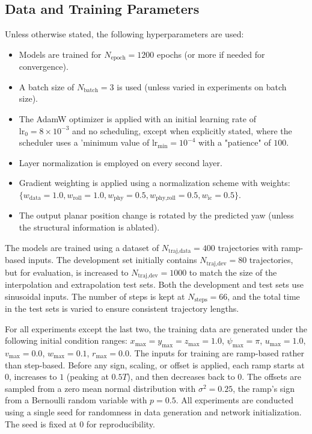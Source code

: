 \documentclass[conference]{IEEEtran}
\begin{document}
{\subsection{Data and Training Parameters}
\label{subsec:data_training_params}
Unless otherwise stated, the following hyperparameters are used:
\begin{itemize}
    \item Models are trained for $N_{\text{epoch}} = 1200$ epochs (or more if needed for convergence).
    \item A batch size of $N_{\text{batch}} = 3$ is used (unless varied in experiments on batch size).
    \item The AdamW optimizer is applied with an initial learning rate of $\text{lr}_0 = 8\times10^{-3}$ and no scheduling, except when explicitly stated, where the scheduler uses a 'minimum value of $\text{lr}_{\min}=10^{-4}$ with a "patience" of $100$.
    \item Layer normalization is employed on every second layer.
    \item Gradient weighting is applied using a normalization scheme with weights: $\{w_{\text{data}} = 1.0, w_{\text{roll}} = 1.0, w_{\text{phy}} = 0.5, w_{\text{phy,roll}} = 0.5, w_{\text{ic}} = 0.5\}$.
    \item The output planar position change is rotated by the predicted yaw (unless the structural information is ablated).
\end{itemize}

The models are trained using a dataset of $N_{\text{traj,data}} = 400$ trajectories with ramp-based inputs. The development set initially contains $N_{\text{traj,dev}} = 80$ trajectories, but for evaluation, is increased to $N_{\text{traj,dev}} = 1000$ to match the size of the interpolation and extrapolation test sets. Both the development and test sets use sinusoidal inputs. The number of steps is kept at $N_{\text{steps}} = 66$, and the total time in the test sets is varied to ensure consistent trajectory lengths.

For all experiments except the last two, the training data are generated under the following initial condition ranges: $x_{\max} = y_{\max} = z_{\max} = 1.0$, $\psi_{\max} = \pi$, $u_{\max} = 1.0$, $v_{\max} =0.0$, $w_{\max} = 0.1$, $r_{\max} = 0.0$. The inputs for training are ramp-based rather than step-based. Before any sign, scaling, or offset is applied, each ramp starts at $0$, increases to $1$ (peaking at $0.5T$), and then decreases back to $0$. The offsets are sampled from a zero mean normal distribution with $\sigma^2=0.25$, the ramp's sign from a Bernoulli random variable with $p=0.5$. 
All experiments are conducted using a single seed for randomness in data generation and network initialization. The seed is fixed at 0 for reproducibility.

}
\end{document}
